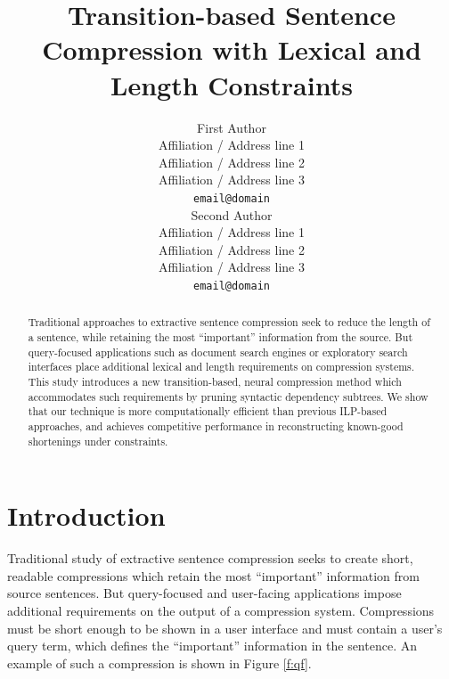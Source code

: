\documentclass[11pt,a4paper]{article}
\title{Transition-based Sentence Compression with Lexical and Length Constraints}
\author{First Author \\
  Affiliation / Address line 1 \\
  Affiliation / Address line 2 \\
  Affiliation / Address line 3 \\
  {\tt email@domain} \\\And
  Second Author \\
  Affiliation / Address line 1 \\
  Affiliation / Address line 2 \\
  Affiliation / Address line 3 \\
  {\tt email@domain} \\}
\date{}
\newcommand{\ahcomment}[1]{\textcolor{blue}{[#1 -AH]}}
\begin{document}
\maketitle




\begin{abstract}
Traditional approaches to extractive sentence compression seek to reduce the length of a sentence, while retaining the most ``important'' information from the source. But query-focused applications such as document search engines or exploratory search interfaces place additional lexical and length requirements on compression systems. This study introduces a new transition-based, neural compression method which accommodates such requirements by pruning syntactic dependency subtrees.  We show that our technique is more computationally efficient than previous ILP-based approaches, and achieves competitive performance in reconstructing known-good shortenings under constraints.
\end{abstract}

\section{Introduction}

Traditional study of extractive sentence compression seeks to create short, readable compressions which retain the most ``important'' information from source sentences. But query-focused and user-facing applications impose additional requirements on the output of a compression system. Compressions must be short enough to be shown in a user interface and must contain a user's query term, which defines the ``important'' information in the sentence. An example of such a compression is shown in Figure \ref{f:qf}.
\end{document}
